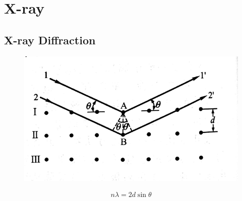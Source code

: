 \chapter{X-ray}

\section{X-ray Diffraction}

\begin{figure}[H]
  \centering
  \includegraphics[width=0.7\linewidth]{figures/bragg-formula}
\end{figure}

\begin{equation*}
  \begin{aligned}
    n \lambda = 2 d \sin \theta
  \end{aligned}
\end{equation*}

